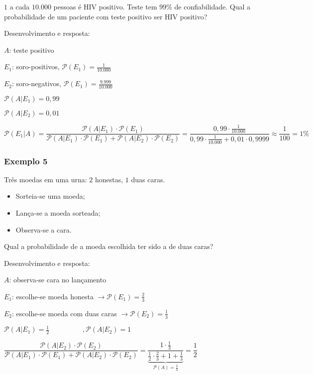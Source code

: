\documentclass[a4paper]{article}
\newcommand{\nota}[2][]{\todo[color=yellow!30,linecolor=black, #1]{#2}}
\begin{document}
	\noindent $1$ a cada $10.000$ pessoas é HIV positivo. Teste tem $99\%$ de confiabilidade. Qual a probabilidade de um paciente com teste positivo ser HIV positivo?
	
	Desenvolvimento e resposta:
	
	$A$: teste positivo
	
	$E_{1}$: soro-positivos, $\mathcal{P}(E_{1}) = \frac{1}{10.000}$
	
	$E_{2}$: soro-negativos, $\mathcal{P}(E_{1}) = \frac{9.999}{10.000}$
	
	$\mathcal{P}(A|E_{1}) = 0,99$
	
	$\mathcal{P}(A|E_{2}) = 0,01$
	
	$\mathcal{P}(E_{1}|A) = \dfrac{\mathcal{P}(A|E_{1}) \cdot \mathcal{P}(E_{1})}{\mathcal{P}(A|E_{1}) \cdot \mathcal{P}(E_{1}) + \mathcal{P}(A | E_{2}) \cdot \mathcal{P}(E_{2})} = \dfrac{0,99 \cdot \frac{1}{10.000}}{0,99 \cdot \frac{1}{10.000} + 0,01 \cdot 0,9999} \approx \dfrac{1}{100} = 1\%$
	
	\subsubsection{Exemplo 5}
	
	\noindent Três moedas em uma urna: $2$ honestas, $1$ duas caras.
	
	\begin{itemize}
		\item Sorteia-se uma moeda;
		\item Lança-se a moeda sorteada;
		\item Observa-se a cara.
	\end{itemize}
	
	\noindent \nota{$\mathcal{P}(E_{2} | A) = ?$}Qual a probabilidade de a moeda escolhida ter sido a de duas caras?
	
	Desenvolvimento e resposta:
	
	$A$: observa-se cara no lançamento
	
	$E_{1}$: escolhe-se moeda honesta $\rightarrow \mathcal{P}(E_{1}) = \frac{2}{3}$
	
	$E_{2}$: escolhe-se moeda com duas caras $\rightarrow \mathcal{P}(E_{2}) = \frac{1}{3}$
	
	$\mathcal{P}(A|E_{1}) = \frac{1}{2} \hspace{2cm}, \mathcal{P}(A|E_{2}) = 1$
	
	$\dfrac{\mathcal{P}(A|E_{2}) \cdot \mathcal{P}(E_{2})}{\mathcal{P}(A|E_{1}) \cdot \mathcal{P}(E_{1}) + \mathcal{P}(A|E_{2}) \cdot \mathcal{P}(E_{2})} = \underbrace{\dfrac{1 \cdot \frac{1}{3}}{\frac{1}{2} \cdot \frac{2}{3} + 1 + \frac{1}{3}}}_{\mathcal{P}(A) = \frac{2}{3}} = \dfrac{1}{2}$
	
\end{document}

